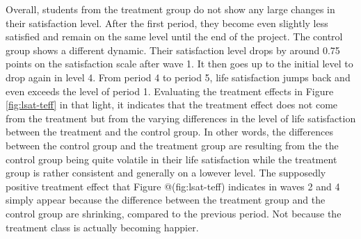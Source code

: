\documentclass[a4, 12pt]{article}
\begin{document}
Overall, students from the treatment group do not show any large changes in their satisfaction level. After the first period, they become even slightly less satisfied and remain on the same level until the end of the project. The control group shows a different dynamic. Their satisfaction level drops by around 0.75 points on the satisfaction scale after wave 1. It then goes up to the initial level to drop again in level 4. From period 4 to period 5, life satisfaction jumps back and even exceeds the level of period 1. Evaluating the treatment effects in Figure \ref{fig:lsat-teff} in that light, it indicates that the treatment effect does not come from the treatment but from the varying differences in the level of life satisfaction between the treatment and the control group. In other words, the differences between the control group and the treatment group are resulting from the the control group being quite volatile in their life satisfaction while the treatment group is rather consistent and generally on a lowever level. The supposedly positive treatment effect that Figure @(fig:lsat-teff) indicates in waves 2 and 4 simply appear because the difference between the treatment group and the control group are shrinking, compared to the previous period. Not because the treatment class is actually becoming happier.
\end{document}
